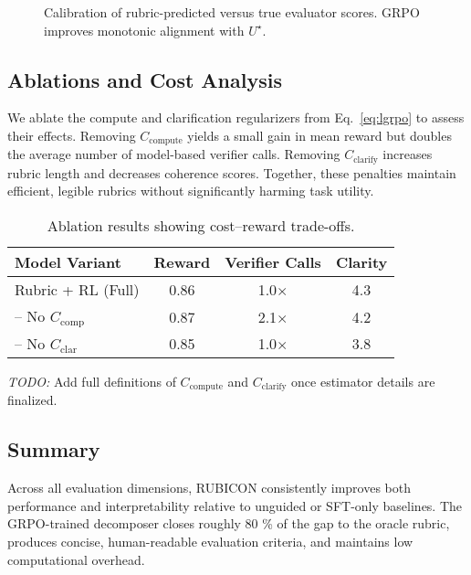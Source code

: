\documentclass[sigconf]{acmart}
\begin{document}
\begin{figure}[h]
\centering
{}
\caption{Calibration of rubric-predicted versus true evaluator scores. 
GRPO improves monotonic alignment with $U^\star$.}
\label{fig:calibration}
\end{figure}

\subsection{Ablations and Cost Analysis}

We ablate the compute and clarification regularizers 
from Eq.~\ref{eq:lgrpo} to assess their effects.
Removing $C_{\mathrm{compute}}$ yields a small gain in mean reward 
but doubles the average number of model-based verifier calls.
Removing $C_{\mathrm{clarify}}$ increases rubric length 
and decreases coherence scores.
Together, these penalties maintain efficient, legible rubrics
without significantly harming task utility.

\begin{table}[h]
\centering
\caption{Ablation results showing cost–reward trade-offs.}
\begin{tabular}{lccc}
\toprule
Model Variant & Reward & Verifier Calls & Clarity \\
\midrule
Rubric + RL (Full) & 0.86 & 1.0$\times$ & 4.3 \\
-- No $C_{\mathrm{comp}}$ & 0.87 & 2.1$\times$ & 4.2 \\
-- No $C_{\mathrm{clar}}$ & 0.85 & 1.0$\times$ & 3.8 \\
\bottomrule
\end{tabular}
\end{table}

\noindent
\textit{TODO:} Add full definitions of $C_{\mathrm{compute}}$ and $C_{\mathrm{clarify}}$ once estimator details are finalized.

\subsection{Summary}

Across all evaluation dimensions, 
RUBICON consistently improves both performance and interpretability 
relative to unguided or SFT-only baselines.
The GRPO-trained decomposer closes roughly 80 \% of the gap to the oracle rubric, 
produces concise, human-readable evaluation criteria, 
and maintains low computational overhead.
\end{document}
